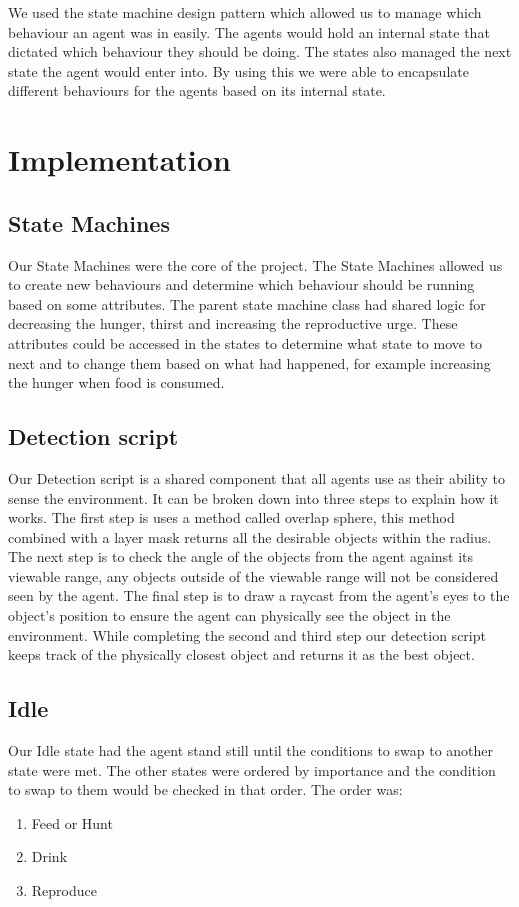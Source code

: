 \documentclass[a4paper, oneside, 11pt]{report}
\begin{document}
We used the state machine design pattern which allowed us to manage which behaviour an agent was in easily. The agents would hold an internal state that dictated which behaviour they should be doing. The states also managed the next state the agent would enter into. By using this we were able to encapsulate different behaviours for the agents based on its internal state.


\chapter{Implementation}\label{Impl}

\section{State Machines}

	Our State Machines were the core of the project. The State Machines allowed us to create new behaviours and determine which behaviour should be running based on some attributes. The parent state machine class had shared logic for decreasing the hunger, thirst and increasing the reproductive urge. These attributes could be accessed in the states to determine what state to move to next and to change them based on what had happened, for example increasing the hunger when food is consumed.

\section{Detection script}
	Our Detection script is a shared component that all agents use as their ability to sense the environment. It can be broken down into three steps to explain how it works. The first step is uses a method called overlap sphere, this method combined with a layer mask returns all the desirable objects within the radius. The next step is to check the angle of the objects from the agent against its viewable range, any objects outside of the viewable range will not be considered seen by the agent. The final step is to draw a raycast from the agent's eyes to the object's position to ensure the agent can physically see the object in the environment. While completing the second and third step our detection script keeps track of the physically closest object and returns it as the best object.

\section{Idle}
	Our Idle state had the agent stand still until the conditions to swap to another state were met. The other states were ordered by importance and the condition to swap to them would be checked in that order. The order was:
	\begin{enumerate}
		\item{Feed or Hunt}
		\item{Drink}
		\item{Reproduce}
	\end{enumerate}
\end{document}
